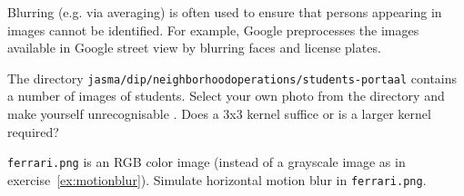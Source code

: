 \documentclass{book}
\begin{document}
\begin{exercise}
Blurring (e.g. via averaging) is often used to ensure that persons appearing in images cannot be identified. For example, Google preprocesses the images available in Google street view by blurring faces and license plates. 

The directory \texttt{jasma/dip/neighborhoodoperations/students-portaal} contains a number of images of students. Select your own photo from the directory and make yourself unrecognisable . Does a 3x3 kernel suffice or is a larger kernel required? 
\end{exercise}

\begin{exercise}
\texttt{ferrari.png} is an RGB color image (instead of a grayscale image as in exercise~\ref{ex:motionblur}).  Simulate horizontal motion blur in \texttt{ferrari.png}.
\end{exercise}
\end{document}
